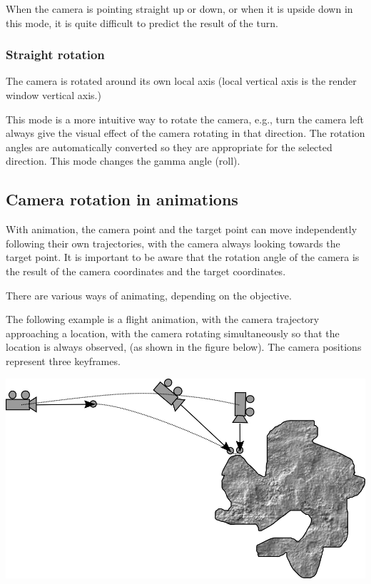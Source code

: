 When the camera is pointing straight up or down, or when it is upside down in
this mode, it is quite difficult to predict the result of the turn.

\subsubsection{Straight rotation}\label{straight-rotation}

The camera is rotated around its own local axis (local vertical axis is the
render window vertical axis.)

This mode is a more intuitive way to rotate the camera, e.g., turn the camera
left always give the visual effect of the camera rotating in that direction. The
rotation angles are automatically converted so they are appropriate for the
selected direction. This mode changes the gamma angle (roll).

\subsection{Camera rotation in animations}\label{camera-rotation-in-animations}

With animation, the camera point and the target point can move independently
following their own trajectories, with the camera always looking towards the
target point. It is important to be aware that the rotation angle of the camera
is the result of the camera coordinates and the target coordinates.

There are various ways of animating, depending on the objective.

The following example is a flight animation, with the camera trajectory
approaching a location, with the camera rotating simultaneously so that the
location is always observed, (as shown in the figure below). The camera
positions represent three keyframes.

\includegraphics[width=0.7\linewidth]{img/manual/media/camera_target_tracking.png}

